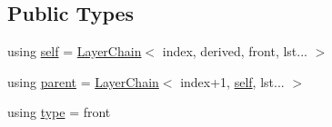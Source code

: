 \subsection*{Public Types}
\begin{DoxyCompactItemize}
\item 
using \hyperlink{structBC_1_1nn_1_1LayerChain_3_01index_00_01derived_00_01front_00_01lst_8_8_8_01_4_a019e4116d3fbd4915e563c3403038b3b}{self} = \hyperlink{structBC_1_1nn_1_1LayerChain}{Layer\+Chain}$<$ index, derived, front, lst... $>$
\item 
using \hyperlink{structBC_1_1nn_1_1LayerChain_3_01index_00_01derived_00_01front_00_01lst_8_8_8_01_4_aa13da50858a3d1477c061e3a6678a880}{parent} = \hyperlink{structBC_1_1nn_1_1LayerChain}{Layer\+Chain}$<$ index+1, \hyperlink{structBC_1_1nn_1_1LayerChain_3_01index_00_01derived_00_01front_00_01lst_8_8_8_01_4_a019e4116d3fbd4915e563c3403038b3b}{self}, lst... $>$
\item 
using \hyperlink{structBC_1_1nn_1_1LayerChain_3_01index_00_01derived_00_01front_00_01lst_8_8_8_01_4_ab76878d061de75b9a45e97be78ab8e0e}{type} = front
\end{DoxyCompactItemize}
